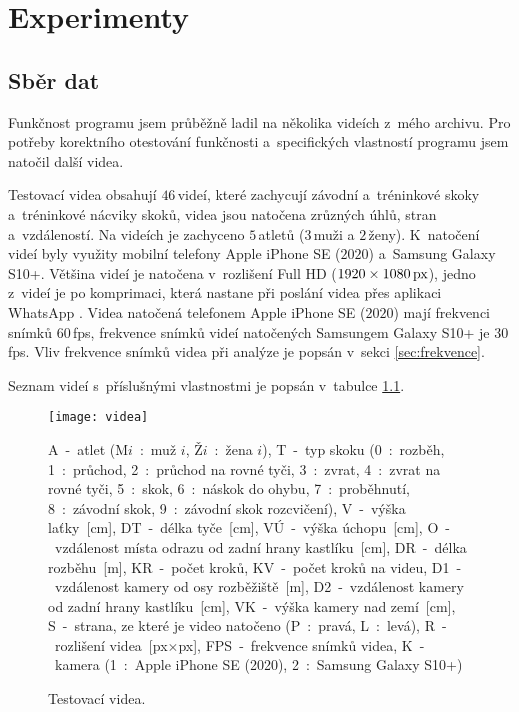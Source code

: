 \chapter{Experimenty}

\section{Sběr dat}

Funkčnost programu jsem průběžně ladil na několika videích z~mého archivu. Pro potřeby korektního otestování funkčnosti a~specifických vlastností programu jsem natočil další videa.

Testovací videa obsahují $46$\,\rm videí, které zachycují závodní a~tréninkové skoky a~tréninkové nácviky skoků, videa jsou natočena zrůzných úhlů, stran a~vzdáleností. Na videích je zachyceno $5$\,\rm atletů ($3$\,\rm muži a $2$\,\rm ženy). K~natočení videí byly využity mobilní telefony Apple iPhone SE ($2020$) a~Samsung Galaxy S10+. Většina videí je natočena v~rozlišení Full HD ($1920\times 1080\,\rm px$), jedno z~videí je po komprimaci, která nastane při poslání videa přes aplikaci WhatsApp \citep{WhatsApp}. Videa natočená telefonem Apple iPhone SE ($2020$) mají frekvenci snímků $60$\,\rm fps, frekvence snímků videí natočených Samsungem Galaxy S10+ je $30$\,\rm fps. Vliv frekvence snímků videa při analýze je popsán v~sekci \ref{sec:frekvence}.

Seznam videí s~příslušnými vlastnostmi je popsán v~tabulce \ref{fig:videa}.

\begin{figure}[p]\centering
\texttt{[image: videa]}
\caption{Testovací videa.}
\small
    A~-~atlet 
        (M$i$~:~muž $i$,
        Ž$i$~:~žena $i$), 
    T~-~typ skoku 
        (0~:~rozběh, 
        1~:~průchod, 
        2~:~průchod na rovné tyči, 
        3~:~zvrat, 
        4~:~zvrat na rovné tyči, 
        5~:~skok, 
        6~:~náskok do ohybu, 
        7~:~proběhnutí, 
        8~:~závodní skok, 
        9~:~závodní skok rozcvičení), 
    V~-~výška laťky~[cm], 
    DT~-~délka tyče~[cm], 
    VÚ~-~výška úchopu~[cm], 
    O~-~vzdálenost místa odrazu od zadní hrany kastlíku~[cm], 
    DR~-~délka rozběhu~[m], 
    KR~-~počet kroků, 
    KV~-~počet kroků na videu, 
    D1~-~vzdálenost kamery od osy rozběžiště~[m], 
    D2~-~vzdálenost kamery od zadní hrany kastlíku~[cm], 
    VK~-~výška kamery nad zemí~[cm], 
    S~-~strana, ze které je video natočeno 
        (P~:~pravá, 
        L~:~levá), 
    R~-~rozlišení videa~[px$\times$px], 
    FPS~-~frekvence snímků videa, 
    K~-~kamera 
        (1~:~Apple iPhone SE (2020),
        2~:~Samsung Galaxy S10+)
\label{fig:videa}
\end{figure}


